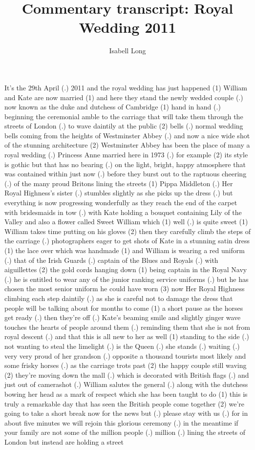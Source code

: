 \documentclass{article}
\begin{document}
\title{Commentary transcript: Royal Wedding 2011}
\author{Isabell Long}
\maketitle

It's the 29th April (.) 2011 and the royal wedding has just happened (1) William and Kate are now married (1) and here they stand the newly wedded couple (.) now known as the duke and dutchess of Cambridge (1) hand in hand (.) beginning the ceremonial amble to the carriage that will take them through the streets of London (.) to wave daintily at the public (2) bells (.) normal wedding bells coming from the heights of Westminster Abbey (.) and now a nice wide shot of the stunning architecture (2) Westminster Abbey has been the place of many a royal wedding (.) Princess Anne married here in 1973 (.) for example (2) its style is gothic but that has no bearing (.) on the light, bright, happy atmosphere that was contained within just now (.) before they burst out to the raptuous cheering (.) of the many proud Britons lining the streets (1) Pippa Middleton (.) Her Royal Highness's sister (.) stumbles slightly as she picks up the dress (.) but everything is now progressing wonderfully as they reach the end of the carpet with bridesmaids in tow (.) with Kate holding a bouquet containing Lily of the Valley and also a flower called Sweet William which (1) well (.) is quite sweet (1) William takes time putting on his gloves (2) then they carefully climb the steps of the carriage (.) photographers eager to get shots of Kate in a stunning satin dress (1) the lace over which was handmade (1) and William is wearing a red uniform (.) that of the Irish Guards (.) captain of the Blues and Royals (.) with aiguillettes (2) the gold cords hanging down (1) being captain in the Royal Navy (.) he is entitled to wear any of the junior ranking service uniforms (.) but he has chosen the most senior uniform he could have worn (3) now Her Royal Highness climbing each step daintily (.) as she is careful not to damage the dress that people will be talking about for months to come (1) a short pause as the horses get ready (.) then they're off (.) Kate's beaming smile and slightly ginger wave touches the hearts of people around them (.) reminding them that she is not from royal descent (.) and that this is all new to her as well (1) standing to the side (.) not wanting to steal the limelight (.) is the Queen (.) she stands (.) waiting (.) very very proud of her grandson (.) opposite a thousand tourists most likely and some frisky horses (.) as the carriage trots past (2) the happy couple still waving (2) they're moving down the mall (.) which is decorated with British flags (.) and just out of camerashot (.) William salutes the general (.) along with the dutchess bowing her head as a mark of respect which she has been taught to do (1) this is truly a remarkable day that has seen the British people come together (2) we're going to take a short break now for the news but (.) please stay with us (.) for in about five minutes we will rejoin this glorious ceremony (.) in the meantime if your family are not some of the million people (.) million (.) lining the streets of London but instead are holding a street 
\end{document}
